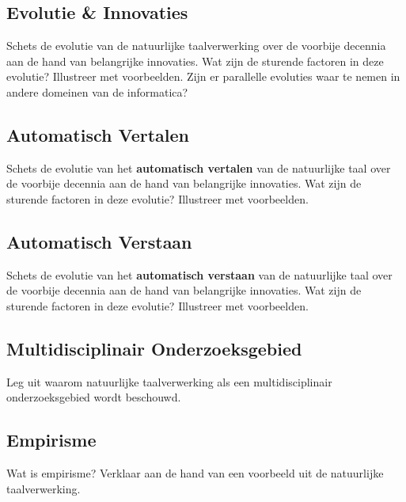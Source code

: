 \documentclass[../main.tex]{subfiles}
\begin{document}
\subsection{Evolutie \& Innovaties}
\begin{question}
Schets de evolutie van de natuurlijke taalverwerking over de voorbije decennia aan de hand van belangrijke innovaties. Wat zijn de sturende factoren in deze evolutie? Illustreer met voorbeelden.
Zijn er parallelle evoluties waar te nemen in andere domeinen van de informatica?
\end{question}

\subsection{Automatisch Vertalen}
\begin{question}
Schets de evolutie van het \textbf{automatisch vertalen} van de natuurlijke taal over de voorbije decennia aan de hand van belangrijke innovaties.
Wat zijn de sturende factoren in deze evolutie?
Illustreer met voorbeelden.
\end{question}

\subsection{Automatisch Verstaan}
\begin{question}
Schets de evolutie van het \textbf{automatisch verstaan} van de natuurlijke taal over de voorbije decennia aan de hand van belangrijke innovaties.
Wat zijn de sturende factoren in deze evolutie?
Illustreer met voorbeelden.
\end{question}

\subsection{Multidisciplinair Onderzoeksgebied}
\begin{question}
Leg uit waarom natuurlijke taalverwerking als een multidisciplinair onderzoeksgebied wordt beschouwd.
\end{question}

\subsection{Empirisme}
\begin{question}
Wat is empirisme? Verklaar aan de hand van een voorbeeld uit de natuurlijke taalverwerking.
\end{question}
\end{document}
